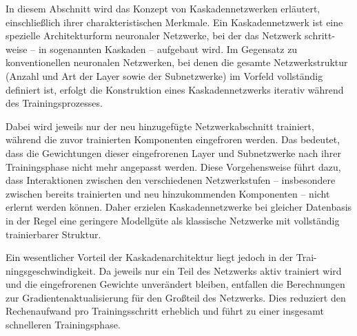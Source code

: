 In diesem Abschnitt wird das Konzept von Kaskadennetzwerken erläutert, einschließlich ihrer charakteristischen Merkmale. Ein Kaskadennetzwerk ist 
eine spezielle Architekturform neuronaler Netzwerke, bei der das Netzwerk schritt-weise – in sogenannten Kaskaden – aufgebaut wird. Im Gegensatz zu 
konventionellen neuronalen Netzwerken, bei denen die gesamte Netzwerkstruktur (Anzahl und Art der Layer sowie der Subnetzwerke) im Vorfeld 
vollständig definiert ist, erfolgt die Konstruktion eines Kaskadennetzwerks iterativ während des Trainingsprozesses.

Dabei wird jeweils nur der neu hinzugefügte Netzwerkabschnitt trainiert, während die zuvor trainierten Komponenten eingefroren werden. 
Das bedeutet, dass die Gewichtungen dieser eingefrorenen Layer und Subnetzwerke nach ihrer Trainingsphase nicht mehr angepasst werden. Diese 
Vorgehensweise führt dazu, dass Interaktionen zwischen den verschiedenen Netzwerkstufen – insbesondere zwischen bereits trainierten und neu 
hinzukommenden Komponenten – nicht erlernt werden können. Daher erzielen Kaskadennetzwerke bei gleicher Datenbasis in der Regel eine 
geringere Modellgüte als klassische Netzwerke mit vollständig trainierbarer Struktur.

Ein wesentlicher Vorteil der Kaskadenarchitektur liegt jedoch in der Trai-ningsgeschwindigkeit. Da jeweils nur ein Teil des Netzwerks aktiv 
trainiert wird und die eingefrorenen Gewichte unverändert bleiben, entfallen die Berechnungen zur Gradientenaktualisierung für den Großteil des 
Netzwerks. Dies reduziert den Rechenaufwand pro Trainingsschritt erheblich und führt zu einer insgesamt schnelleren Trainingsphase.
